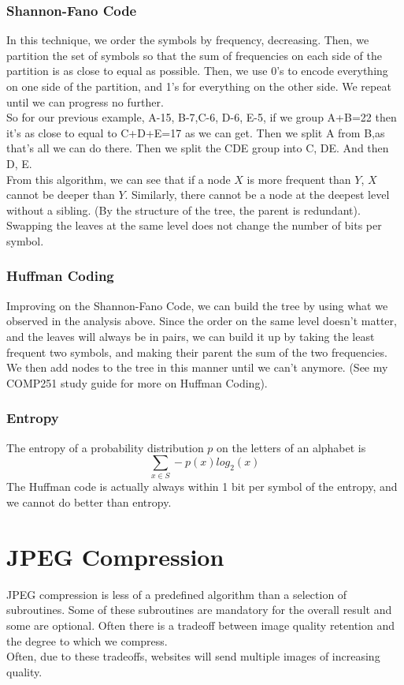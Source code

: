 \documentclass[12pt]{article}
\theoremstyle{definition}
\begin{document}
\subsubsection{Shannon-Fano Code}
In this technique, we order the symbols by frequency, decreasing. Then, we partition the set of symbols so that the sum of frequencies on each side of the partition is as close to equal as possible. Then, we use 0's to encode everything on one side of the partition, and 1's for everything on the other side. We repeat until we can progress no further.
\\ \linebreak
So for our previous example, A-15, B-7,C-6, D-6, E-5, if we group A+B=22 then it's as close to equal to C+D+E=17 as we can get. Then we split A from B,as that's all we can do there. Then we split the CDE group into C, DE. And then D, E. 
\\ \linebreak
From this algorithm, we can see that if a node $X$ is more frequent than $Y$, $X$ cannot be deeper than $Y$. Similarly, there cannot be a node at the deepest level without a sibling. (By the structure of the tree, the parent is redundant). Swapping the leaves at the same level does not change the number of bits per symbol.

\subsubsection{Huffman Coding}
Improving on the Shannon-Fano Code, we can build the tree by using what we observed in the analysis above. Since the order on the same level doesn't matter, and the leaves will always be in pairs, we can build it up by taking the least frequent two symbols, and making their parent the sum of the two frequencies. We then add nodes to the tree in this manner until we can't anymore. (See my COMP251 study guide for more on Huffman Coding).

\subsubsection{Entropy}
The entropy of a probability distribution $p$ on the letters of an alphabet is 
$$\sum_{x \in S}-p(x)log_2(x)$$
The Huffman code is actually always within 1 bit per symbol of the entropy, and we cannot do better than entropy. 

\section{JPEG Compression}
JPEG compression is less of a predefined algorithm than a selection of subroutines. Some of these subroutines are mandatory for the overall result and some are optional. Often there is a tradeoff between image quality retention and the degree to which we compress. 
\\ \linebreak
 Often, due to these tradeoffs, websites will send multiple images of increasing quality. 
\end{document}
